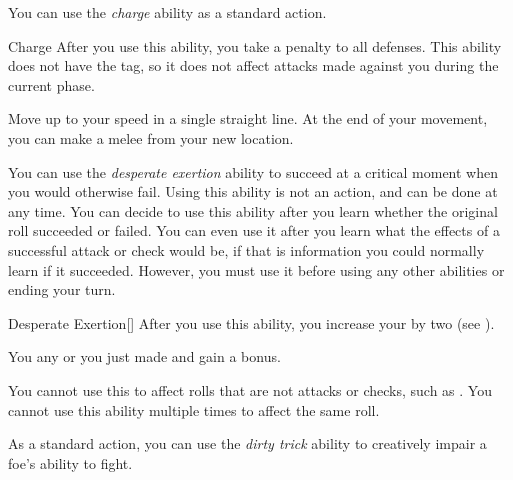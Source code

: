        \label{Charge} You can use the \textit{charge} ability as a standard action.

        \begin{activeability}{Charge}
            \rankline
            After you use this ability, you  take a  penalty to all defenses.
            This ability does not have the  tag, so it does not affect attacks made against you during the current phase.

            Move up to your speed in a single straight line.
            At the end of your movement, you can make a melee  from your new location.
        \end{activeability}

        \label{Desperate Exertion} You can use the \textit{desperate exertion} ability to succeed at a critical moment when you would otherwise fail.
        Using this ability is not an action, and can be done at any time.
        You can decide to use this ability after you learn whether the original roll succeeded or failed.
        You can even use it after you learn what the effects of a successful attack or check would be, if that is information you could normally learn if it succeeded.
        However, you must use it before using any other abilities or ending your turn.

        \begin{activeability}{Desperate Exertion}[]
            \rankline
            After you use this ability, you increase your  by two (see ).

            You  any  or  you just made and gain a  bonus.

            You cannot use this to affect rolls that are not attacks or checks, such as .
            You cannot use this ability multiple times to affect the same roll.
        \end{activeability}

        \label{Dirty Trick} As a standard action, you can use the \textit{dirty trick} ability to creatively impair a foe's ability to fight.

